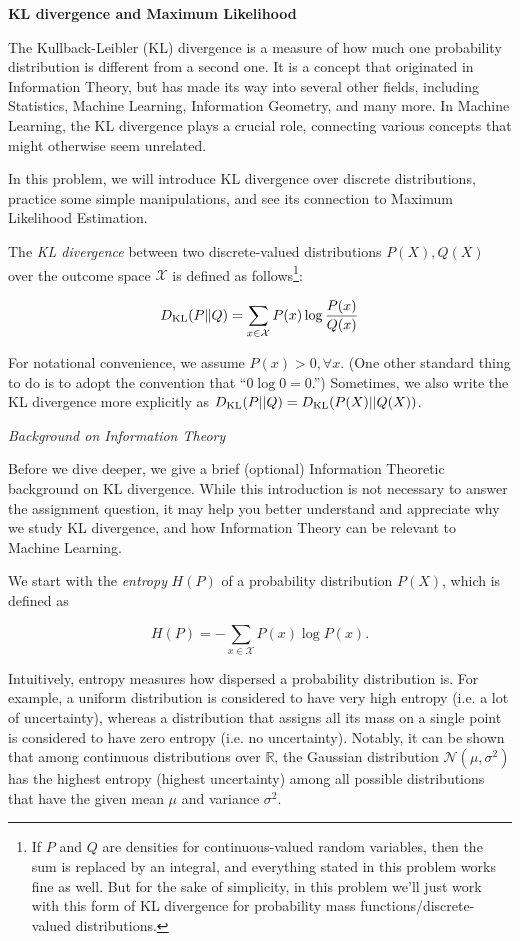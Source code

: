 \clearpage
\item {} {\bf KL divergence and Maximum Likelihood}

The Kullback-Leibler (KL) divergence is a measure of how much
one probability distribution is different from a second one. It is a concept that originated in Information Theory, but has made its
way into several other fields, including Statistics, Machine Learning,
Information Geometry, and many more. In Machine Learning, the KL
divergence plays a crucial role, connecting various concepts
that might otherwise seem unrelated.


In this problem, we will introduce KL divergence over discrete
distributions, practice some simple manipulations, and see its
connection to Maximum Likelihood Estimation.

The \emph{KL divergence} between two discrete-valued
distributions $P(X), Q(X)$  over the outcome space $\mathcal{X}$ is defined as follows\footnote{If $P$ and
  $Q$ are densities for continuous-valued random variables, then the
  sum is replaced by an integral, and everything stated in this
  problem works fine as well.  But for the sake of simplicity, in this
  problem we'll just work with this form of KL divergence for
  probability mass functions/discrete-valued distributions.}:

$$D_{\text{KL}}(P\|Q) = \sum_{x \in \mathcal{X}}P(x)\log\frac{P(x)}{Q(x)}$$

For notational convenience, we assume $P(x)>0, \forall x$.
(One other standard thing to do is to adopt the convention that
``$0 \log 0 = 0$.'')  Sometimes, we also write the KL divergence more explicitly as
$D_{\text{KL}}(P||Q) = D_{\text{KL}}(P(X)||Q(X))$.

\emph{Background on Information Theory}

Before we dive deeper, we give a brief (optional) Information Theoretic
background on KL divergence. While this introduction is not necessary
to answer the assignment question, it may help you better understand
and appreciate why we study KL divergence, and how Information Theory
can be relevant to Machine Learning.

We start with the \emph{entropy} $H(P)$ of a probability distribution $P(X)$, which is defined as

$$ H(P) = -\sum_{x \in \mathcal{X}} P(x) \log P(x). $$

Intuitively, entropy measures how dispersed a probability
distribution is. For example, a uniform distribution is considered to have
very high entropy (i.e. a lot of uncertainty), whereas a distribution that assigns
all its mass on a single point is considered to have zero entropy (i.e. no uncertainty). Notably, it can be shown that among continuous distributions over $\mathbb{R}$, the Gaussian 
distribution $\mathcal{N}(\mu,\sigma^2)$ has the highest entropy (highest uncertainty) among all possible distributions that have the given mean $\mu$ and variance $\sigma^2$.

